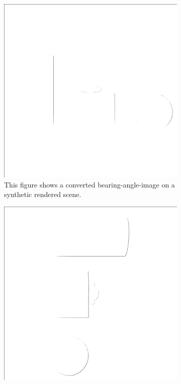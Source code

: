 \begin{figure}[H]
    \begin{subfigure}[t]{0.32\textwidth}
        \includegraphics[width=\linewidth]{chapter04/img/bearing-diag-0001.png}
        \caption{This figure shows a converted \gls{bearing-angle-image} on a synthetic rendered scene.}
    \end{subfigure}
    \begin{subfigure}[t]{0.32\textwidth}
        \includegraphics[width=\linewidth]{chapter04/img/bearing-diag-0030.png}

\end{subfigure}
\end{figure}
